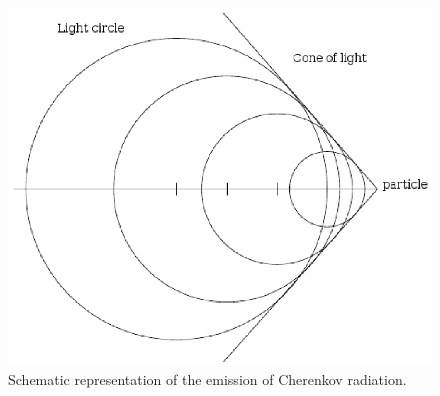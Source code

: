\documentclass[12pt,a4paper]{article}
\numberwithin{equation}{section}
\numberwithin{figure}{section}
\numberwithin{table}{section}
\begin{document}
\begin{figure}\begin{center}
\includegraphics[scale=1]{light_cone_s.eps}%
\caption{Schematic representation of the emission of Cherenkov radiation.}\label{fig:light_cone}
\end{center}\end{figure}
\end{document}
